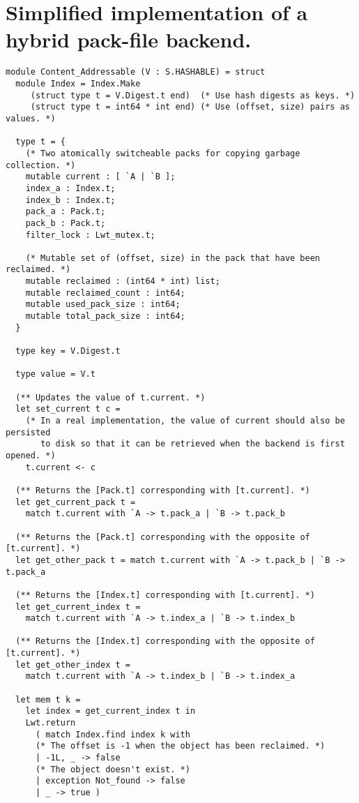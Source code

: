 \section{Simplified implementation of a hybrid pack-file backend.}
\label{app:pack-lazy}

\begin{verbatim}
module Content_Addressable (V : S.HASHABLE) = struct
  module Index = Index.Make
     (struct type t = V.Digest.t end)  (* Use hash digests as keys. *)
     (struct type t = int64 * int end) (* Use (offset, size) pairs as values. *)

  type t = {
    (* Two atomically switcheable packs for copying garbage collection. *)
    mutable current : [ `A | `B ];
    index_a : Index.t;
    index_b : Index.t;
    pack_a : Pack.t;
    pack_b : Pack.t;
    filter_lock : Lwt_mutex.t;

    (* Mutable set of (offset, size) in the pack that have been reclaimed. *)
    mutable reclaimed : (int64 * int) list;
    mutable reclaimed_count : int64;
    mutable used_pack_size : int64;
    mutable total_pack_size : int64;
  }

  type key = V.Digest.t

  type value = V.t

  (** Updates the value of t.current. *)
  let set_current t c =
    (* In a real implementation, the value of current should also be persisted
       to disk so that it can be retrieved when the backend is first opened. *)
    t.current <- c

  (** Returns the [Pack.t] corresponding with [t.current]. *)
  let get_current_pack t =
    match t.current with `A -> t.pack_a | `B -> t.pack_b

  (** Returns the [Pack.t] corresponding with the opposite of [t.current]. *)
  let get_other_pack t = match t.current with `A -> t.pack_b | `B -> t.pack_a

  (** Returns the [Index.t] corresponding with [t.current]. *)
  let get_current_index t =
    match t.current with `A -> t.index_a | `B -> t.index_b

  (** Returns the [Index.t] corresponding with the opposite of [t.current]. *)
  let get_other_index t =
    match t.current with `A -> t.index_b | `B -> t.index_a

  let mem t k =
    let index = get_current_index t in
    Lwt.return
      ( match Index.find index k with
      (* The offset is -1 when the object has been reclaimed. *)
      | -1L, _ -> false
      (* The object doesn't exist. *)
      | exception Not_found -> false
      | _ -> true )


\end{verbatim}
